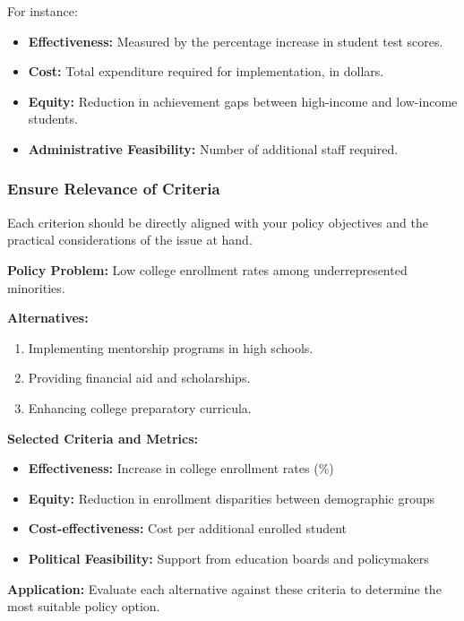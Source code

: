 \documentclass{article}
\theoremstyle{definition}
\theoremstyle{plain}
\begin{document}
For instance:

\begin{itemize}
    \item \textbf{Effectiveness:} Measured by the percentage increase in student test scores.

    \item \textbf{Cost:} Total expenditure required for implementation, in dollars.

    \item \textbf{Equity:} Reduction in achievement gaps between high-income and low-income students.

    \item \textbf{Administrative Feasibility:} Number of additional staff required.
\end{itemize}

\subsubsection{Ensure Relevance of Criteria}

Each criterion should be directly aligned with your policy objectives and the practical considerations of the issue at hand.

\begin{tcolorbox}[colback=gray!5!white, colframe=gray!75!black, title=Example: Applying Criteria to Policy Alternatives]

\textbf{Policy Problem:} Low college enrollment rates among underrepresented minorities.

\textbf{Alternatives:}

\begin{enumerate}[label=\alph*.]
    \item Implementing mentorship programs in high schools.
    \item Providing financial aid and scholarships.
    \item Enhancing college preparatory curricula.
\end{enumerate}

\textbf{Selected Criteria and Metrics:}

\begin{itemize}
    \item \textbf{Effectiveness:} Increase in college enrollment rates (\%)
    
    \item \textbf{Equity:} Reduction in enrollment disparities between demographic groups
    
    \item \textbf{Cost-effectiveness:} Cost per additional enrolled student
    
    \item \textbf{Political Feasibility:} Support from education boards and policymakers
\end{itemize}

\textbf{Application:} Evaluate each alternative against these criteria to determine the most suitable policy option.

\end{tcolorbox}
\end{document}
